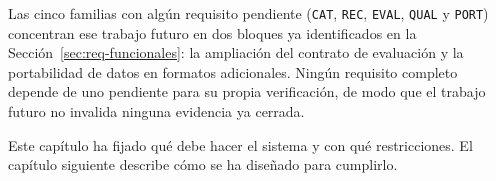 Las cinco familias con algún requisito pendiente (\texttt{CAT}, \texttt{REC}, \texttt{EVAL},
\texttt{QUAL} y \texttt{PORT}) concentran ese trabajo futuro en dos bloques ya identificados en
la Sección~\ref{sec:req-funcionales}: la ampliación del contrato de evaluación y la
portabilidad de datos en formatos adicionales. Ningún requisito completo depende de uno
pendiente para su propia verificación, de modo que el trabajo futuro no invalida ninguna
evidencia ya cerrada.

Este capítulo ha fijado qué debe hacer el sistema y con qué restricciones. El capítulo
siguiente describe cómo se ha diseñado para cumplirlo.
